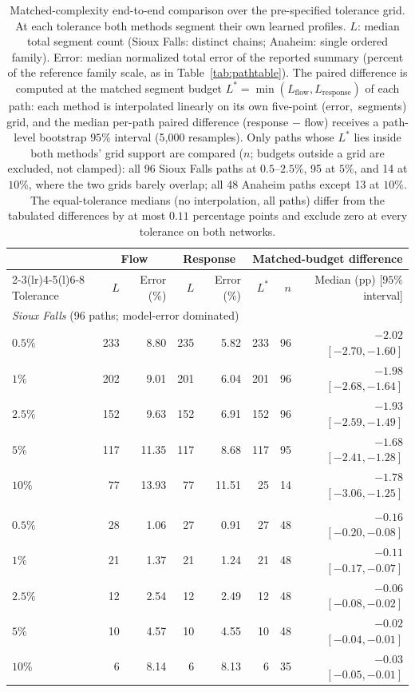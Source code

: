 \begin{table}[t]\centering\footnotesize
\caption{Matched-complexity end-to-end comparison over the
pre-specified tolerance grid. At each tolerance both methods segment
their own learned profiles. $L$: median total segment count (Sioux
Falls: distinct chains; Anaheim: single ordered family). Error: median
normalized total error of the reported summary (percent of the
reference family scale, as in Table~\ref{tab:pathtable}). The paired
difference is computed at the matched segment budget
$L^{*}=\min(L_{\mathrm{flow}},L_{\mathrm{response}})$ of each path:
each method is interpolated linearly on its own five-point
(error,~segments) grid, and the median per-path paired difference
(response $-$ flow) receives a path-level bootstrap $95\%$ interval
(5{,}000 resamples). Only paths whose $L^{*}$ lies inside both
methods' grid support are compared ($n$; budgets outside a grid are
excluded, not clamped): all 96 Sioux Falls paths at $0.5$--$2.5\%$,
95 at $5\%$, and 14 at $10\%$, where the two grids barely overlap;
all 48 Anaheim paths except 13 at $10\%$. The equal-tolerance medians
(no interpolation, all paths) differ from the tabulated differences by
at most $0.11$ percentage points and exclude zero at every tolerance
on both networks.}\label{tab:matched}
\setlength{\tabcolsep}{4.2pt}
\begin{tabular*}{\tblwidth}{@{\extracolsep{\fill}}lrrrrrrr}
\toprule
 & \multicolumn{2}{c}{Flow} & \multicolumn{2}{c}{Response} & \multicolumn{3}{c}{Matched-budget difference}\\
\cmidrule(lr){2-3}\cmidrule(lr){4-5}\cmidrule(l){6-8}
Tolerance & $L$ & Error (\%) & $L$ & Error (\%) & $L^{*}$ & $n$ & Median (pp) [$95\%$ interval]\\
\midrule
\multicolumn{8}{l}{\emph{Sioux Falls} (96 paths; model-error dominated)}\\
$0.5\%$ & 233 & 8.80 & 235 & 5.82 & 233 & 96 & $-2.02$ $[-2.70,-1.60]$\\
$1\%$ & 202 & 9.01 & 201 & 6.04 & 201 & 96 & $-1.98$ $[-2.68,-1.64]$\\
$2.5\%$ & 152 & 9.63 & 152 & 6.91 & 152 & 96 & $-1.93$ $[-2.59,-1.49]$\\
$5\%$ & 117 & 11.35 & 117 & 8.68 & 117 & 95 & $-1.68$ $[-2.41,-1.28]$\\
$10\%$ & 77 & 13.93 & 77 & 11.51 & 25 & 14 & $-1.78$ $[-3.06,-1.25]$\\
\addlinespace
\multicolumn{8}{l}{\emph{Anaheim} (48 paths; compression dominated at $5\%$)}\\
$0.5\%$ & 28 & 1.06 & 27 & 0.91 & 27 & 48 & $-0.16$ $[-0.20,-0.08]$\\
$1\%$ & 21 & 1.37 & 21 & 1.24 & 21 & 48 & $-0.11$ $[-0.17,-0.07]$\\
$2.5\%$ & 12 & 2.54 & 12 & 2.49 & 12 & 48 & $-0.06$ $[-0.08,-0.02]$\\
$5\%$ & 10 & 4.57 & 10 & 4.55 & 10 & 48 & $-0.02$ $[-0.04,-0.01]$\\
$10\%$ & 6 & 8.14 & 6 & 8.13 & 6 & 35 & $-0.03$ $[-0.05,-0.01]$\\
\bottomrule\end{tabular*}\end{table}

